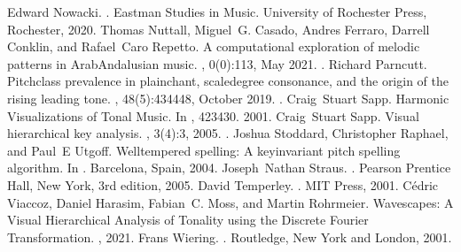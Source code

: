\documentclass[letterpaper,10pt,english]{sphinxmanual}
\begin{document}
\begin{sphinxthebibliography}{10}
Edward Nowacki. . Eastman Studies in Music. University of Rochester Press, Rochester, 2020.
Thomas Nuttall, Miguel G. Casado, Andres Ferraro, Darrell Conklin, and Rafael Caro Repetto. A computational exploration of melodic patterns in Arab\sphinxhyphen{}Andalusian music. , 0(0):1\textendash{}13, May 2021. .
Richard Parncutt. Pitch\sphinxhyphen{}class prevalence in plainchant, scale\sphinxhyphen{}degree consonance, and the origin of the rising leading tone. , 48(5):434\textendash{}448, October 2019. .
Craig Stuart Sapp. Harmonic Visualizations of Tonal Music. In , 423\textendash{}430. 2001.
Craig Stuart Sapp. Visual hierarchical key analysis. , 3(4):3, 2005. .
Joshua Stoddard, Christopher Raphael, and Paul E Utgoff. Well\sphinxhyphen{}tempered spelling: A key\sphinxhyphen{}invariant pitch spelling algorithm. In . Barcelona, Spain, 2004.
Joseph Nathan Straus. . Pearson Prentice Hall, New York, 3rd edition, 2005.
David Temperley. . MIT Press, 2001.
Cédric Viaccoz, Daniel Harasim, Fabian C. Moss, and Martin Rohrmeier. Wavescapes: A Visual Hierarchical Analysis of Tonality using the Discrete Fourier Transformation. , 2021.
Frans Wiering. . Routledge, New York and London, 2001.
\end{sphinxthebibliography}


\renewcommand{\indexname}{Python Module Index}
\begin{sphinxtheindex}
\let\bigletter\sphinxstyleindexlettergroup
\bigletter{m}
\item\relax{}
\end{sphinxtheindex}

\renewcommand{\indexname}{Index}
\printindex
\end{document}
